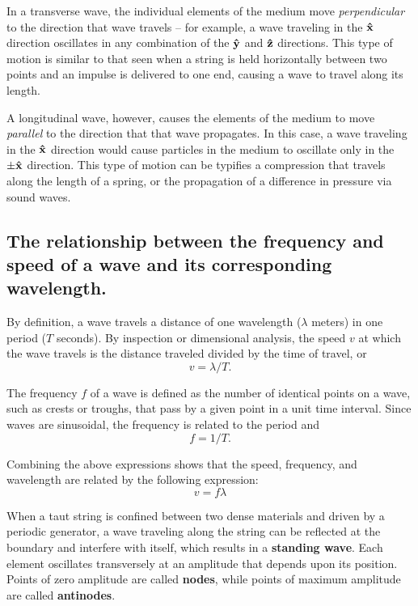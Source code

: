 \documentclass[twocolumn,english]{IEEEtran}
\theoremstyle{plain}
\theoremstyle{plain}
\begin{document}
In a transverse wave, the individual elements of the medium move \textit{perpendicular} to the direction that wave travels -- for example, a wave traveling in the $\bf{\hat x}$ direction oscillates in any combination of the $\bf{\hat y}$ and $\bf{\hat z}$ directions. This type of motion is similar to that seen when a string is held horizontally between two points and an impulse is delivered to one end, causing a wave to travel along its length.

A longitudinal wave, however, causes the elements of the medium to move \textit{parallel} to the direction that that wave propagates. In this case, a wave traveling in the $\bf{\hat x}$ direction would cause particles in the medium to oscillate only in the $\pm\bf{\hat x}$ direction. This type of motion can be typifies a compression that travels along the length of a spring, or the propagation of a difference in pressure via sound waves.

\subsection{The relationship between the frequency and speed of a wave and its corresponding wavelength.}

By definition, a wave travels a distance of one wavelength ($\lambda$ meters) in one period ($T$ seconds). By inspection or dimensional analysis, the speed $v$ at which the wave travels is the distance traveled divided by the time of travel, or
\begin{equation*}
 v=\lambda / T.
\end{equation*}

The frequency $f$ of a wave is defined as the number of identical points on a wave, such as crests or troughs, that pass by a given point in a unit time interval. Since waves are sinusoidal, the frequency is related to the period and
\begin{equation*}
f=1/T.
\end{equation*}

Combining the above expressions shows that the speed, frequency, and wavelength are related by the following expression:
\begin{equation}\label{eq:v.f.lambda}
 v=f\lambda
\end{equation}

When a taut string is confined between two dense materials and driven by a periodic generator, a wave traveling along the string can be reflected at the boundary and interfere with itself, which results in a \textbf{standing wave}. Each element oscillates transversely at an amplitude that depends upon its position. Points of zero amplitude are called \textbf{nodes}, while points of maximum amplitude are called \textbf{antinodes}.
\end{document}
